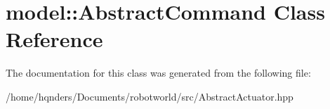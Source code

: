 \hypertarget{class_model_1_1_abstract_command}{}\section{model\+:\+:Abstract\+Command Class Reference}
\label{class_model_1_1_abstract_command}


The documentation for this class was generated from the following file\+:\begin{DoxyCompactItemize}
\item 
/home/hqnders/\+Documents/robotworld/src/Abstract\+Actuator.\+hpp\end{DoxyCompactItemize}
